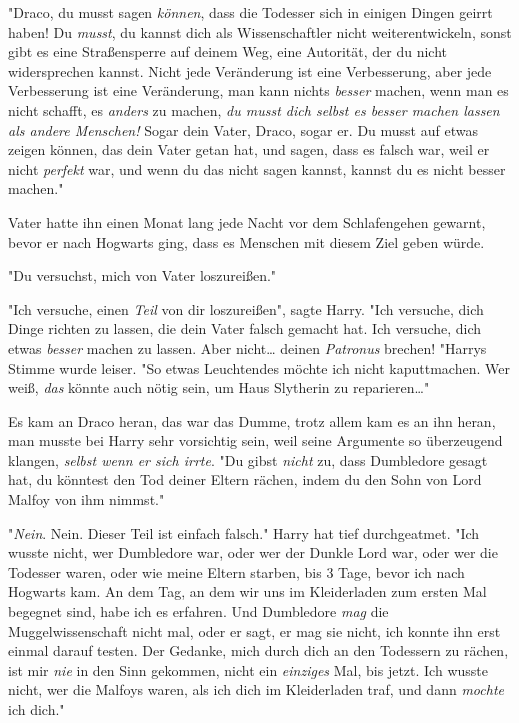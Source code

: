 {"Draco, du musst sagen \emph{können}, dass die Todesser sich in einigen Dingen geirrt haben! Du \emph{musst}, du kannst dich als Wissenschaftler nicht weiterentwickeln, sonst gibt es eine Straßensperre auf deinem Weg, eine Autorität, der du nicht widersprechen kannst. Nicht jede Veränderung ist eine Verbesserung, aber jede Verbesserung ist eine Veränderung, man kann nichts \emph{besser} machen, wenn man es nicht schafft, es \emph{anders} zu machen, \emph{du musst dich selbst es besser machen lassen als andere Menschen!} Sogar dein Vater, Draco, sogar er. Du musst auf etwas zeigen können, das dein Vater getan hat, und sagen, dass es falsch war, weil er nicht \emph{perfekt} war, und wenn du das nicht sagen kannst, kannst du es nicht besser machen."

Vater hatte ihn einen Monat lang jede Nacht vor dem Schlafengehen gewarnt, bevor er nach Hogwarts ging, dass es Menschen mit diesem Ziel geben würde.

"Du versuchst, mich von Vater loszureißen."

"Ich versuche, einen \emph{Teil} von dir loszureißen", sagte Harry. "Ich versuche, dich Dinge richten zu lassen, die dein Vater falsch gemacht hat. Ich versuche, dich etwas \emph{besser} machen zu lassen. Aber nicht… deinen \emph{Patronus} brechen! "Harrys Stimme wurde leiser. "So etwas Leuchtendes möchte ich nicht kaputtmachen. Wer weiß, \emph{das} könnte auch nötig sein, um Haus Slytherin zu reparieren…"

Es kam an Draco heran, das war das Dumme, trotz allem kam es an ihn heran, man musste bei Harry sehr vorsichtig sein, weil seine Argumente so überzeugend klangen, \emph{selbst wenn er sich irrte}. "Du gibst \emph{nicht} zu, dass Dumbledore gesagt hat, du könntest den Tod deiner Eltern rächen, indem du den Sohn von Lord Malfoy von ihm nimmst."

"\emph{Nein}. Nein. Dieser Teil ist einfach falsch." Harry hat tief durchgeatmet. "Ich wusste nicht, wer Dumbledore war, oder wer der Dunkle Lord war, oder wer die Todesser waren, oder wie meine Eltern starben, bis 3 Tage, bevor ich nach Hogwarts kam. An dem Tag, an dem wir uns im Kleiderladen zum ersten Mal begegnet sind, habe ich es erfahren. Und Dumbledore \emph{mag} die Muggelwissenschaft nicht mal, oder er sagt, er mag sie nicht, ich konnte ihn erst einmal darauf testen. Der Gedanke, mich durch dich an den Todessern zu rächen, ist mir \emph{nie} in den Sinn gekommen, nicht ein \emph{einziges} Mal, bis jetzt. Ich wusste nicht, wer die Malfoys waren, als ich dich im Kleiderladen traf, und dann \emph{mochte} ich dich."

}
